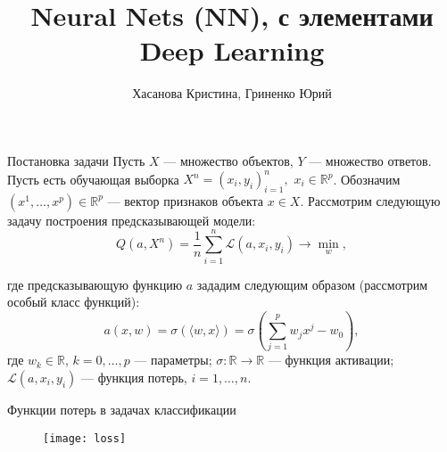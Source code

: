 \documentclass[11pt]{beamer}
\begin{document}
	\title[Neural Nets]{Neural Nets (NN), с элементами Deep Learning}
	\author{Хасанова Кристина, Гриненко Юрий}
	
	
	\begin{frame}
		\titlepage 
	\end{frame}

	\begin{frame}{Постановка задачи}
		Пусть $X$ --- множество объектов, $Y$ --- множество ответов. Пусть есть обучающая выборка $X^n = (x_i, y_i)_{i=1}^{n},$ $x_i \in \mathbb{R}^p$. Обозначим $(x^1,\ldots,x^p)\in \mathbb{R}^p$ --- вектор признаков объекта $x\in X$. Рассмотрим следующую задачу построения предсказывающей модели:
		\begin{equation*}
			Q(a, X^n) = \frac{1}{n} \sum_{i=1}^{n} \mathcal{L}(a,x_i,y_i) \rightarrow \min_w,
		\end{equation*}
	
		\pause
	
		где предсказывающую функцию $a$ зададим следующим образом (рассмотрим особый класс функций):
		\begin{equation*}
			a(x, w) = \sigma( \langle w,x \rangle ) = \sigma\left(\sum_{j=1}^{p} w_j x^j - w_0 \right),
		\end{equation*}
		где $w_k \in \mathbb{R}$, $k=0,\ldots,p$ --- параметры; 
		$\sigma: \mathbb{R} \rightarrow  \mathbb{R} $ --- функция активации;
		$\mathcal{L}(a,x_i,y_i)$ --- функция потерь, $i=1,\ldots,n$.
	\end{frame}

	\begin{frame}{Функции потерь в задачах классификации}
		\begin{figure}[hhh!]
			\begin{center}
				\texttt{[image: loss]}
			\end{center}
			\vspace{-5mm}
		\end{figure}
	\end{frame}
\end{document}
